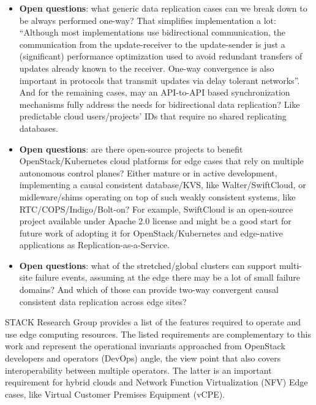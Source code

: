 \documentclass[conference]{IEEEtran}
\begin{document}
\begin{itemize}
  \item \textbf{Open questions}: what generic data replication cases can we
    break down to be always performed one-way? That simplifies implementation a
    lot: ``Although most implementations use bidirectional communication, the
    communication from the update-receiver to the update-sender is just a
    (significant) performance optimization used to avoid redundant transfers of
    updates already known to the receiver. One-way convergence is also
    important in protocols that transmit updates via delay tolerant
    networks''\cite{b2}. And for the remaining cases, may an API-to-API based
    synchronization mechanisms fully address the needs for bidirectional data
    replication? Like predictable cloud users/projects' IDs that require no
    shared replicating databases.
  \item \textbf{Open questions}: are there open-source projects to benefit
    OpenStack/Kubernetes cloud platforms for edge cases that rely on multiple
    autonomous control planes? Either mature or in active development,
    implementing a causal consistent database/KVS, like Walter/SwiftCloud, or
    midleware/shims operating on top of such weakly consistent systems, like
    RTC/COPS/Indigo/Bolt-on? For example, SwiftCloud is an open-source project
    available under Apache 2.0 license and might be a good start for future
    work of adopting it for OpenStack/Kubernetes and edge-native applications
    as Replication-as-a-Service.
  \item \textbf{Open questions}: what of the stretched/global clusters can
    support multi-site failure events, assuming at the edge there may be a lot
    of small failure domains? And which of those can provide two-way
    convergent causal consistent data replication across edge sites?
\end{itemize}

STACK Research Group\cite{b8} provides a list of the features required to
operate and use edge computing resources. The listed requirements are
complementary to this work and represent the operational invariants approached
from OpenStack developers and operators (DevOps) angle, the view point that
also covers interoperability between multiple operators. The latter is an
important requirement for hybrid clouds and Network Function Virtualization
(NFV) Edge cases, like Virtual Customer Premises Equipment (vCPE).
\end{document}
